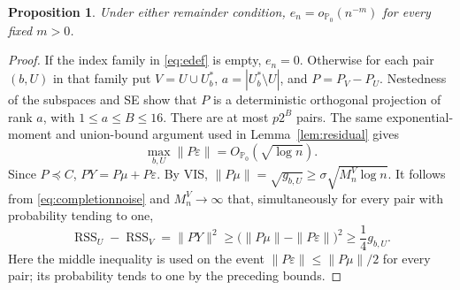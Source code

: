 \documentclass[11pt]{article}
\newtheorem{proposition}{Proposition}
\theoremstyle{remark}\newtheorem{remark}{Remark}
\newcommand{\PP}{\mathbb P_0}
\newcommand{\op}{o_{\PP}}
\newcommand{\Op}{O_{\PP}}
\newcommand{\RSS}{\operatorname{RSS}}
\begin{document}
\begin{proposition}\label{prop:en}
Under either remainder condition, $e_n=\op(n^{-m})$ for every fixed $m>0$.
\end{proposition}

\begin{proof}
If the index family in \eqref{eq:edef} is empty, $e_n=0$. Otherwise for
each pair $(b,U)$ in that family put
$V=U\cup U_b^*$, $a=|U_b^*\setminus U|$, and $P=P_V-P_U$.
Nestedness of the subspaces and SE show that $P$ is a deterministic
orthogonal projection of rank $a$, with $1\le a\le B\le16$.
There are at most $p2^B$ pairs. The same exponential-moment and union-bound
argument used in Lemma~\ref{lem:residual} gives
\begin{equation}\label{eq:completionnoise}
 \max_{b,U}\|P\varepsilon\|=\Op(\sqrt{\log n}).
\end{equation}
Since $P\preceq C$, $PY=P\mu+P\varepsilon$. By VIS,
$\|P\mu\|=\sqrt{g_{b,U}}\ge\sigma\sqrt{M_n^V\log n}$.
It follows from \eqref{eq:completionnoise} and $M_n^V\to\infty$ that,
simultaneously for every pair with probability tending to one,
\begin{equation}\label{eq:gainobs}
 \RSS_U-\RSS_V=\|PY\|^2
 \ge\bigl(\|P\mu\|-\|P\varepsilon\|\bigr)^2
 \ge\frac14 g_{b,U}.
\end{equation}
Here the middle inequality is used on the event
$\|P\varepsilon\|\le\|P\mu\|/2$ for every pair; its probability
tends to one by the preceding bounds.


\end{proof}
\end{document}
